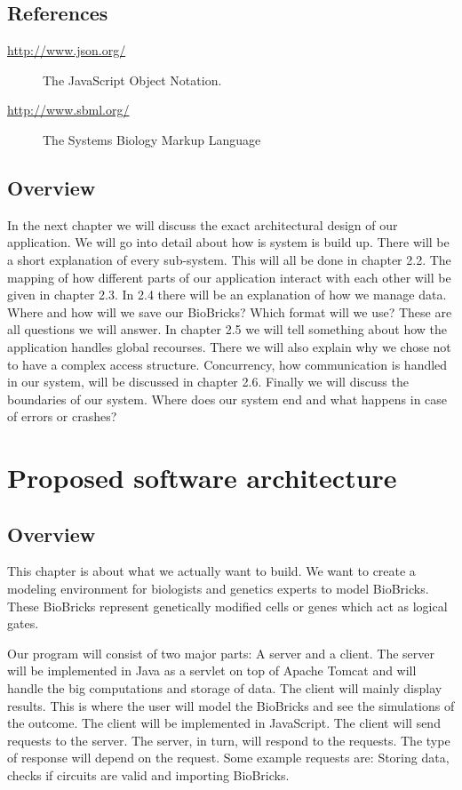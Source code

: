 \documentclass[a4paper]{article}
\begin{document}
\subsection{References}
\begin{description}
        \item[\url{http://www.json.org/}] The JavaScript Object Notation.
        \item[\url{http://www.sbml.org/}] The Systems Biology Markup Language
\end{description}

\subsection{Overview}
In the next chapter we will discuss the exact architectural design of our application. We will go into detail about how is system is build up. There will be a short explanation of every sub-system. This will all be done in chapter 2.2. The mapping of how different parts of our application interact with each other will be given in chapter 2.3. In 2.4 there will be an explanation of how we manage data. Where and how will we save our BioBricks? Which format will we use? These are all questions we will answer. In chapter 2.5 we will tell something about how the application handles global recourses. There we will also explain why we chose not to have a complex access structure. Concurrency, how communication is handled in our system, will be discussed in chapter 2.6. Finally we will discuss the boundaries of our system. Where does our system end and what happens in case of errors or crashes? 

\section{Proposed software architecture}
\subsection{Overview}
This chapter is about what we actually want to build. We want to create a modeling environment for biologists and genetics experts to model BioBricks. These BioBricks represent genetically modified cells or genes which act as logical gates. 


Our program will consist of two major parts: A server and a client. The server will be implemented in Java as a servlet on top of Apache Tomcat and will handle the big computations and storage of data. The client will mainly display results. This is where the user will model the BioBricks and see the simulations of the outcome. The client will be implemented in JavaScript. The client will send requests to the server. The server, in turn, will respond to the requests. The type of response will depend on the request. Some example requests are: Storing data, checks if circuits are valid and importing BioBricks. 
\end{document}
